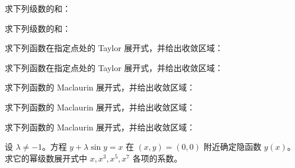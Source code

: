 \newpage
\noindent\begin{minipage}{\textwidth}
求下列级数的和：
\end{minipage}\par\vfill
\noindent\begin{minipage}{\textwidth}
求下列级数的和：
\end{minipage}\par\vfill
\noindent\begin{minipage}{\textwidth}
求下列函数在指定点处的 Taylor 展开式，并给出收敛区域：
\end{minipage}\par\vfill
\noindent\begin{minipage}{\textwidth}
求下列函数在指定点处的 Taylor 展开式，并给出收敛区域：
\end{minipage}\par\vfill
\newpage
\noindent\begin{minipage}{\textwidth}
求下列函数的 Maclaurin 展开式，并给出收敛区域：
\end{minipage}\par\vfill
\noindent\begin{minipage}{\textwidth}
求下列函数的 Maclaurin 展开式，并给出收敛区域：
\end{minipage}\par\vfill
\noindent\begin{minipage}{\textwidth}
求下列函数的 Maclaurin 展开式，并给出收敛区域：
\end{minipage}\par\vfill
\noindent\begin{minipage}{\textwidth}
设 $\lambda\ne-1$。方程 $y+\lambda\sin y=x$ 在 $(x,y)=(0,0)$ 附近确定隐函数 $y(x)$。求它的幂级数展开式中 $x,x^3,x^5,x^7$ 各项的系数。
\end{minipage}\par\vfill
